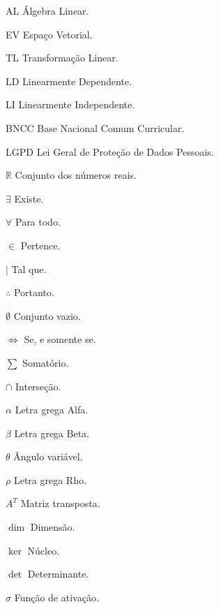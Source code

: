 \documentclass[
12pt,
 a4paper,
    english,
    brazil,
    oneside
    ]{abntex2}
\begin{document}
	
	\listoffigures*
	\cleardoublepage
	
	
	\listoftables*
	\cleardoublepage
	
	\begin{siglas}
		\item[AL] Álgebra Linear.
		\item[EV] Espaço Vetorial.
		\item[TL] Transformação Linear.
		\item[LD] Linearmente Dependente.
		\item[LI] Linearmente Independente.
		\item[BNCC] Base Nacional Comum Curricular.
		\item[LGPD] Lei Geral de Proteção de Dados Pessoais.
	\end{siglas}
	
	\begin{simbolos}
		\item[$ \mathbb{R} $] Conjunto dos números reais.
		\item[$\exists$] Existe.
		\item[$\forall$] Para todo.
		\item[$\in$] Pertence.
		\item[$\mid$] Tal que.
		\item[$\therefore$] Portanto.
		\item[$\emptyset$] Conjunto vazio.
		\item[$\iff$] Se, e somente se.
		\item[$\sum$] Somatório.
		\item[$\cap$] Interseção.
		\item[$\alpha$] Letra grega Alfa.
		\item[$\beta$] Letra grega Beta.
		\item[$\theta$] Ângulo variável.
		\item[$\rho$] Letra grega Rho.
		\item[$A^T$] Matriz transposta.
		\item[$\dim$] Dimensão.
		\item[$\ker$] Núcleo.
		\item[$\det$] Determinante.
		\item[$\sigma$] Função de ativação.
	\end{simbolos}
	
\end{document}

